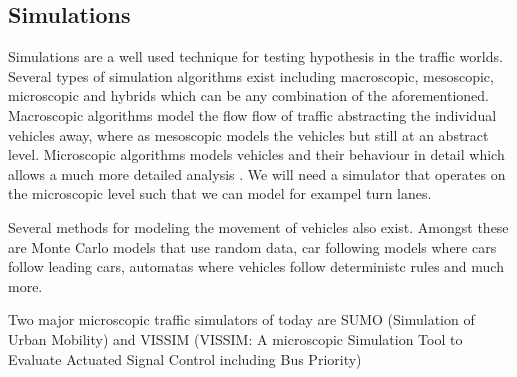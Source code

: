 \subsection{Simulations}
Simulations are a well used technique for testing hypothesis in the traffic worlds.
Several types of simulation algorithms exist including macroscopic, mesoscopic, microscopic and hybrids which can be any combination of the aforementioned. Macroscopic algorithms model the flow flow of traffic abstracting the individual vehicles away, where as mesoscopic models the vehicles but still at an abstract level. Microscopic algorithms models vehicles and their behaviour in detail which allows a much more detailed analysis \cite{meso-micro}. We will need a simulator that operates on the microscopic level such that we can model for exampel turn lanes.

Several methods for modeling the movement of vehicles also exist. Amongst these are Monte Carlo models \cite{} that use random data, car following models \cite{} where cars follow leading cars, automatas where vehicles follow deterministc rules \cite{} and much more.

Two major microscopic traffic simulators of today are SUMO (Simulation of Urban Mobility)\cite{sumo} and VISSIM (VISSIM: A microscopic Simulation Tool to Evaluate Actuated Signal Control including Bus Priority)








